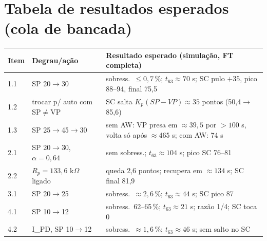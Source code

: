 \documentclass[11pt,a4paper]{article}
\begin{document}
\section{Tabela de resultados esperados (cola de bancada)}
\begin{center}\small
\begin{tabular}{llp{8cm}}\toprule Item & Degrau/ação & Resultado esperado (simulação, FT completa)\\\midrule
1.1 & SP 20$\to$30 & sobress.\ $\le0{,}7\,\%$; $t_{63}\approx70$ s; SC pulo $+35$, pico 88--94, final 75,5\\
1.2 & trocar p/ auto com SP$\ne$VP & SC salta $K_p(SP-VP)\approx35$ pontos (50,4$\to$85,6)\\
1.3 & SP 25$\to$45$\to$30 & sem AW: VP presa em $\approx39{,}5$ por $>100$ s, volta só após $\approx465$ s; com AW: 74 s\\
2.1 & SP 20$\to$30, $\alpha=0{,}64$ & sem sobress.; $t_{63}\approx104$ s; pico SC 76--81\\
2.2 & $R_p=133{,}6$ k$\Omega$ ligado & queda 2,6 pontos; recupera em $\approx134$ s; SC final 81,9\\
3.1 & SP 20$\to$25 & sobress.\ $\approx2{,}6\,\%$; $t_{63}\approx44$ s; SC pico 87\\
4.1 & SP 10$\to$12 & sobress.\ 62--65\,\%; $t_{63}\approx21$ s; razão 1/4; SC toca 0\\
4.2 & I\_PD, SP 10$\to$12 & sobress.\ $\approx1{,}6\,\%$; $t_{63}\approx46$ s; sem salto no SC\\\bottomrule\end{tabular}\end{center}
\end{document}
